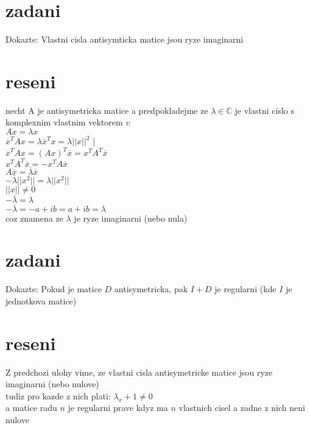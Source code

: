 \documentclass[a4paper]{article}
\begin{document}
\section*{zadani}
Dokazte: Vlastni cisla antisymticka matice jsou ryze imaginarni

\section*{reseni}
necht A je antisymetricka matice a predpokladejme ze $\lambda \in \mathbb{C}$
je vlastni cislo s komplexnim vlastnim vektorem $v$\\
$Ax=\lambda x$\\
$\overline{x}^TAx=\lambda\overline{x}^Tx=\lambda||x||^2$ |  \\
$\overline{x}^TAx=(Ax)^T\overline{x}=x^TA^T\overline{x}$\\
$x^TA^T\overline{x}=-x^TA\overline{x}$\\
$A\overline{x}=\overline{\lambda}\overline{x}$\\
$-\overline{\lambda}||x^2||=\lambda||x^2||$\\
$||x||\neq0$\\
$-\overline{\lambda}=\lambda$\\
$-\overline{\lambda}=-a +ib = a+ib=\lambda$\\
coz znamena ze $\lambda$ je ryze imaginarni (nebo nula)










\section*{zadani}
Dokazte: Pokud je matice $D$ antisymetricka, pak $I+D$ je regularni (kde $I$ je jednotkova matice)

\section*{reseni}
Z predchozi ulohy vime, ze vlastni cisla antisymetricke matice jsou ryze imaginarni (nebo nulove)\\
tudiz pro kazde z nich plati: $\lambda_x + 1 \neq 0$\\
a matice radu $n$ je regularni prave kdyz ma $n$ vlastnich cisel a zadne z nich neni nulove 
\end{document}
